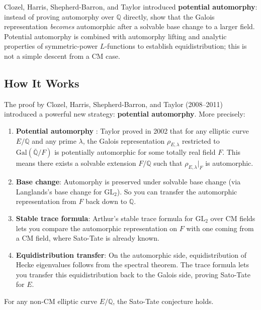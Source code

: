 Clozel, Harris, Shepherd-Barron, and Taylor introduced \textbf{potential automorphy}: instead of proving automorphy over $\mathbb{Q}$ directly, show that the Galois representation \emph{becomes} automorphic after a solvable base change to a larger field. Potential automorphy is combined with automorphy lifting and analytic properties of symmetric-power $L$-functions to establish equidistribution; this is not a simple descent from a CM case.

\subsection{How It Works}

The proof by Clozel, Harris, Shepherd-Barron, and Taylor (2008--2011) introduced a powerful new strategy: \textbf{potential automorphy}. More precisely:

\begin{enumerate}
\item \textbf{Potential automorphy} \cite{taylor2002}: Taylor proved in 2002 that for any elliptic curve $E/\mathbb{Q}$ and any prime $\lambda$, the Galois representation $\rho_{E,\lambda}$ restricted to $\text{Gal}(\overline{\mathbb{Q}}/F)$ is potentially automorphic for some totally real field $F$. This means there exists a solvable extension $F/\mathbb{Q}$ such that $\rho_{E,\lambda}|_F$ is automorphic.
\item \textbf{Base change}: Automorphy is preserved under solvable base change (via Langlands's base change for $\text{GL}_2$). So you can transfer the automorphic representation from $F$ back down to $\mathbb{Q}$.
\item \textbf{Stable trace formula}: Arthur's stable trace formula for $\text{GL}_2$ over CM fields lets you compare the automorphic representation on $F$ with one coming from a CM field, where Sato-Tate is already known.
\item \textbf{Equidistribution transfer}: On the automorphic side, equidistribution of Hecke eigenvalues follows from the spectral theorem. The trace formula lets you transfer this equidistribution back to the Galois side, proving Sato-Tate for $E$.
\end{enumerate}

\begin{theorem}
For any non-CM elliptic curve $E/\mathbb{Q}$, the Sato-Tate conjecture holds.
\end{theorem}

